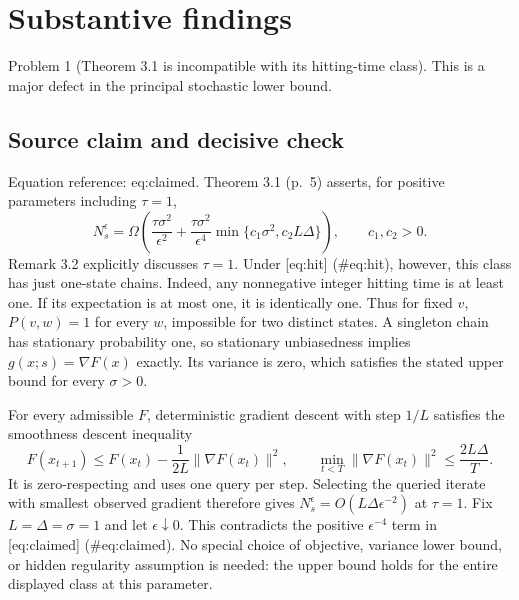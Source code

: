 \documentclass[10pt]{article}
\begin{document}
\section*{Substantive findings}
Problem 1 (Theorem 3.1 is incompatible with its hitting-time class).  This is a major defect in the principal stochastic lower bound.\par
\subsection*{Source claim and decisive check}
Equation reference: eq:claimed. Theorem 3.1 (p. 5) asserts, for positive parameters including \(\tau=1\), \[
 N_s^\epsilon=\Omega\left(\frac{\tau\sigma^2}{\epsilon^2}
 +\frac{\tau\sigma^2}{\epsilon^4}
 \min\{c_1\sigma^2,c_2L\Delta\}\right),\qquad c_1,c_2>0.\] Remark 3.2 explicitly discusses \(\tau=1\). Under [eq:hit] (\#eq:hit), however, this class has just one-state chains. Indeed, any nonnegative integer hitting time is at least one. If its expectation is at most one, it is identically one. Thus for fixed \(v\), \(P(v,w)=1\) for every \(w\), impossible for two distinct states. A singleton chain has stationary probability one, so stationary unbiasedness implies \(g(x;s)=\nabla F(x)\) exactly. Its variance is zero, which satisfies the stated upper bound for every \(\sigma>0\).\par
For every admissible \(F\), deterministic gradient descent with step \(1/L\) satisfies the smoothness descent inequality \[F(x_{t+1})\leq F(x_t)-\frac{1}{2L}\|\nabla F(x_t)\|^2,
 \qquad
 \min_{t<T}\|\nabla F(x_t)\|^2\leq\frac{2L\Delta}{T}.\] It is zero-respecting and uses one query per step. Selecting the queried iterate with smallest observed gradient therefore gives \(N_s^\epsilon=O(L\Delta\epsilon^{-2})\) at \(\tau=1\). Fix \(L=\Delta=\sigma=1\) and let \(\epsilon\downarrow0\). This contradicts the positive \(\epsilon^{-4}\) term in [eq:claimed] (\#eq:claimed). No special choice of objective, variance lower bound, or hidden regularity assumption is needed: the upper bound holds for the entire displayed class at this parameter.\par
\end{document}
